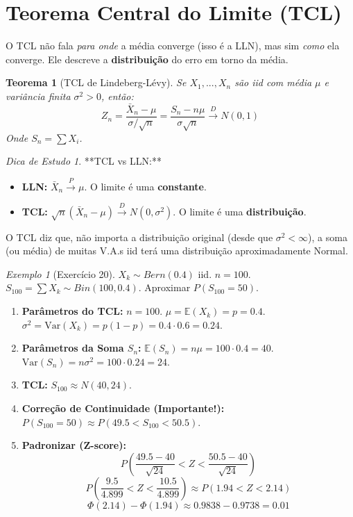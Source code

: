 \documentclass[a4paper, 10pt]{article} %
\theoremstyle{definition}
\theoremstyle{plain}
\newtheorem{theorem}{Teorema}[section]
\theoremstyle{remark}
\newtheorem{example}{Exemplo}[section]
\newtheorem*{tip}{Dica de Estudo} %
\newcommand{\E}{\mathbb{E}}
\newcommand{\Var}{\text{Var}}
\newcommand{\pto}{\xrightarrow{P}}      %
\newcommand{\dto}{\xrightarrow{D}}      %
\newcommand{\Xn}{\bar{X}_n}             %
\begin{document}
\section{Teorema Central do Limite (TCL)}
\label{sec:clt}
O TCL não fala \textit{para onde} a média converge (isso é a LLN), mas sim \textit{como} ela converge. Ele descreve a \textbf{distribuição} do erro em torno da média.

\begin{theorem}[TCL de Lindeberg-Lévy]
Se $X_1, ..., X_n$ são iid com média $\mu$ e variância finita $\sigma^2 > 0$, então:
$$ Z_n = \frac{\Xn - \mu}{\sigma / \sqrt{n}} = \frac{S_n - n\mu}{\sigma \sqrt{n}} \dto N(0, 1) $$
Onde $S_n = \sum X_i$.
\end{theorem}

\begin{tip}
    **TCL vs LLN:**
    \begin{itemize}
        \item \textbf{LLN:} $\Xn \pto \mu$. O limite é uma \textbf{constante}.
        \item \textbf{TCL:} $\sqrt{n}(\Xn - \mu) \dto N(0, \sigma^2)$. O limite é uma \textbf{distribuição}.
    \end{itemize}
    O TCL diz que, não importa a distribuição original (desde que $\sigma^2 < \infty$), a soma (ou média) de muitas V.A.s iid terá uma distribuição aproximadamente Normal.
\end{tip}

\begin{example}[Exercício 20]
    $X_k \sim Bern(0.4)$ iid. $n=100$. $S_{100} = \sum X_k \sim Bin(100, 0.4)$.
    Aproximar $P(S_{100} = 50)$.
    \begin{enumerate}
        \item \textbf{Parâmetros do TCL:} $n=100$.
        $\mu = \E(X_k) = p = 0.4$.
        $\sigma^2 = \Var(X_k) = p(1-p) = 0.4 \cdot 0.6 = 0.24$.
        \item \textbf{Parâmetros da Soma $S_n$:}
        $\E(S_n) = n\mu = 100 \cdot 0.4 = 40$.
        $\Var(S_n) = n\sigma^2 = 100 \cdot 0.24 = 24$.
        \item \textbf{TCL:} $S_{100} \approx N(40, 24)$.
        \item \textbf{Correção de Continuidade (Importante!):}
        $P(S_{100} = 50) \approx P(49.5 < S_{100} < 50.5)$.
        \item \textbf{Padronizar (Z-score):}
        $$ P\left( \frac{49.5 - 40}{\sqrt{24}} < Z < \frac{50.5 - 40}{\sqrt{24}} \right) $$
        $$ P\left( \frac{9.5}{4.899} < Z < \frac{10.5}{4.899} \right) \approx P(1.94 < Z < 2.14) $$
        $$ \Phi(2.14) - \Phi(1.94) \approx 0.9838 - 0.9738 = 0.01 $$
    \end{enumerate}
\end{example}
\end{document}
